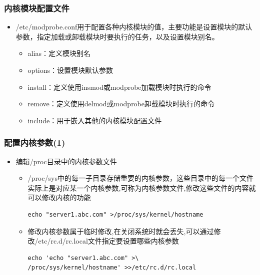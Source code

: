 \documentclass[xcolor=svgnames,presentation]{beamer}
\begin{document}
\begin{frame}
\frametitle{内核模块配置文件}
\label{sec-2-6}
\begin{itemize}

\item /etc/modprobe.conf用于配置各种内核模块的值，主要功能是设置模块的默认参数，指定加载或卸载模块时要执行的任务，以及设置模块别名。
\label{sec-2-6-1}%
\begin{itemize}

\item alias：定义模块别名
\label{sec-2-6-1-1}%

\item options：设置模块默认参数
\label{sec-2-6-1-2}%

\item install：定义使用insmod或modprobe加载模块时执行的命令
\label{sec-2-6-1-3}%

\item remove：定义使用delmod或modprobe卸载模块时执行的命令
\label{sec-2-6-1-4}%

\item include：用于嵌入其他的内核模块配置文件
\label{sec-2-6-1-5}%
\end{itemize} %
\end{itemize} %
\end{frame}
\begin{frame}[fragile]
\frametitle{配置内核参数(1)}
\label{sec-2-7}
\begin{itemize}

\item 编辑/proc目录中的内核参数文件
\label{sec-2-7-1}%
\begin{itemize}

\item /proc/sys中的每一子目录存储重要的内核参数，这些目录中的每一个文件实际上是对应某一个内核参数,可称为内核参数文件,修改这些文件的内容就可以修改内核的功能\\
\label{sec-2-7-1-1}%
\begin{verbatim}
echo "server1.abc.com" >/proc/sys/kernel/hostname
\end{verbatim}

\item 修改内核参数属于临时修改,在关闭系统时就会丢失,可以通过修改/etc/rc.d/rc.local文件指定要设置哪些内核参数\\
\label{sec-2-7-1-2}%
\begin{verbatim}
echo 'echo "server1.abc.com" >\
/proc/sys/kernel/hostname' >>/etc/rc.d/rc.local
\end{verbatim}
\end{itemize} %
\end{itemize} %
\end{frame}
\end{document}
